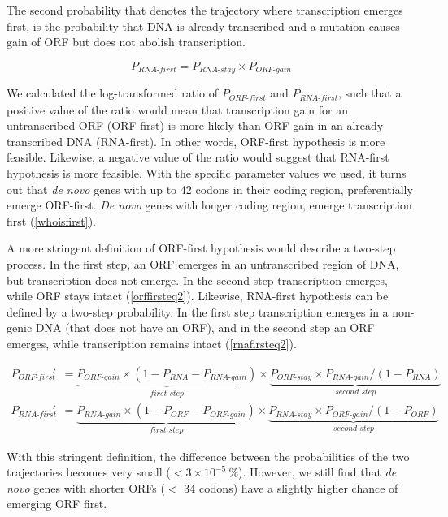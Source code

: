 \documentclass[12pt,a4paper]{article}
\begin{document}
The second probability that denotes the trajectory where transcription emerges first, is the probability that DNA is already transcribed and a mutation causes gain of ORF but does not abolish transcription. 

\begin{equation}
P_\textit{RNA-first} = P_\textit{RNA-stay}\times P_\textit{ORF-gain}
\label{rnafirsteq1}
\end{equation}

We calculated the log-transformed ratio of $P_\textit{ORF-first}$ and $P_\textit{RNA-first}$, such that a positive value of the ratio would mean that transcription gain for an untranscribed ORF (ORF-first) is more likely than ORF gain in an already transcribed DNA (RNA-first). In other words, ORF-first hypothesis is more feasible. Likewise, a negative value of the ratio would suggest that RNA-first hypothesis is more feasible. With the specific parameter values we used, it turns out that \textit{de novo} genes with up to 42 codons in their coding region, preferentially emerge ORF-first. \textit{De novo} genes with longer coding region, emerge transcription first (\autoref{whoisfirst}).

A more stringent definition of ORF-first hypothesis would describe a two-step process. In the first step, an ORF emerges in an untranscribed region of DNA, but transcription does not emerge. In the second step transcription emerges, while ORF stays intact (\autoref{orffirsteq2}). Likewise, RNA-first hypothesis can be defined by a two-step probability. In the first step transcription emerges in a non-genic DNA (that does not have an ORF), and in the second step an ORF emerges, while transcription remains intact (\autoref{rnafirsteq2}).

\begin{align}
P_\textit{ORF-first}' & = \underbrace{P_\textit{ORF-gain} \times (1-P_\textit{RNA} -P_\textit{RNA-gain})}_\textit{first step} \times \underbrace{P_\textit{ORF-stay}\times P_\textit{RNA-gain}/(1-P_\textit{RNA})}_\textit{second step} \label{orffirsteq2}\\[1em]
P_\textit{RNA-first}' & = \underbrace{P_\textit{RNA-gain} \times (1-P_\textit{ORF} -P_\textit{ORF-gain})}_\textit{first step} \times \underbrace{P_\textit{RNA-stay}\times P_\textit{ORF-gain}/(1-P_\textit{ORF})}_\textit{second step}\label{rnafirsteq2}
\end{align}

With this stringent definition, the difference between the probabilities of the two trajectories becomes very small ($< 3\times10^{-5}\ \%$). However, we still find that \textit{de novo} genes with shorter ORFs ($<$ 34 codons) have a slightly higher chance of emerging ORF first.
\end{document}
